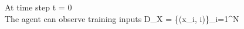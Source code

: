 \documentclass[preview]{standalone}
\begin{document}
\begin{center}
At time step t = 0\\The agent can observe training inputs D_{X} = \{(x_i, i)\}_{i=1}^{N}
\end{center}
\end{document}
